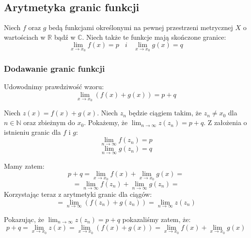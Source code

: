 \documentclass{article}
\begin{document}
\subsection{Arytmetyka granic funkcji}

Niech \(f\) oraz \(g\) bedą funkcjami określonymi na pewnej przestrzeni metrycznej \(X\) o wartościach
w \(\mathbb{R}\) bądź w \(\mathbb{C}\). Niech także te funkcje mają skończone granice:
\begin{equation*}
    \lim_{x \to x_0} f(x) = p \ \ \ \ i \ \ \ \ \lim_{x \to x_0} g(x) = q
\end{equation*}

\subsubsection{Dodawanie granic funkcji}

Udowodnimy prawdziwość wzoru:
\begin{equation*}
    \lim_{x \to x_0}(f(x) + g(x)) = p + q
\end{equation*}

Niech \(z(x) = f(x) + g(x)\). Niech \(z_n\) będzie ciągiem takim, że \(z_n \neq x_0\) dla \(n \in \mathbb{N}\) oraz zbieżnym do \(x_0\).
Pokażemy, że \(\lim_{n \to \infty} z(z_n) = p + q\). Z założenia o istnieniu granic dla \(f\) i \(g\):
\begin{equation*}
    \lim_{n \to \infty} f(z_n) = p
\end{equation*}
\begin{equation*}
    \lim_{n \to \infty} g(z_n) = q
\end{equation*}

Mamy zatem:
\begin{equation*}
    p + q = \lim_{x \to x_0} f(x) + \lim_{x \to x_0} g(x) = 
\end{equation*}
\begin{equation*}
    = \lim_{n \to \infty} f(z_n) + \lim_{n \to \infty} g(z_n) =
\end{equation*}
Korzystając teraz z arytmetyki granic dla ciągów:
\begin{equation*}
    = \lim_{n \to \infty} (f(z_n) + g(z_n)) = \lim_{n \to \infty} z(z_n)
\end{equation*}

Pokazując, że \(\lim_{n \to \infty} z(z_n) = p + q\) pokazaliśmy zatem, że:
\begin{equation*}
    p + q = \lim_{x \to x_0} z(x) = \lim_{x \to x_0} (f(x) + g(x)) = \lim_{x \to x_0} f(x) + \lim_{x \to x_0} g(x)
\end{equation*}
\end{document}
